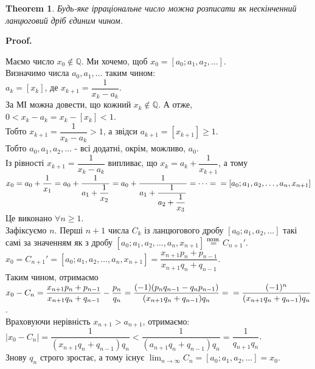 \documentclass[a4paper, 10pt]{article}
\makeatletter
\theoremstyle{theoremdd}
\newtheorem{theorem}{Theorem}[subsection]
\theoremstyle{theoremdd}
\theoremstyle{theoremdd}
\theoremstyle{theoremdd}
\theoremstyle{theoremdd}
\theoremstyle{theoremdd}
\theoremstyle{theoremdd}
\theoremstyle{theoremdd}
\renewenvironment{proof}[1][Proof.\\]{\par
\pushQED{\hfill \qed}%
\normalfont \topsep6\p@\@plus6\p@\relax
\trivlist
\item\relax
{\bfseries
#1\@addpunct{.}}\hspace\labelsep\ignorespaces
}{%
\popQED\endtrivlist\@endpefalse
}
\makeatother
\begin{document}
\begin{theorem}
Будь-яке ірраціональне число можна розписати як нескінченний ланцюговий дріб єдиним чином.
\end{theorem}

\begin{proof}
Маємо число $x_0 \not\in \mathbb{Q}$. Ми хочемо, щоб $x_0 = [a_0;a_1,a_2,\dots]$.\\
Визначимо числа $a_0,a_1,\dots$ таким чином:\\
$a_k = [x_k]$, де $x_{k+1} = \dfrac{1}{x_k - a_k}$.\\
За МІ можна довести, що кожний $x_k \not\in \mathbb{Q}$. А отже, \\ $0 < x_k-a_k = x_k - [x_k] < 1$.\\
Тобто $x_{k+1} = \dfrac{1}{x_k-a_k} > 1$, а звідси $a_{k+1} = [x_{k+1}] \geq 1$.\\
Тобто $a_0, a_1,a_2,\dots$ - всі додатні, окрім, можливо, $a_0$.\\
Із рівності $x_{k+1} = \dfrac{1}{x_k-a_k}$ випливає, що $x_k = a_k + \dfrac{1}{x_{k+1}}$, а тому\\
$x_0 = a_0 + \dfrac{1}{x_1} = a_0 + \dfrac{1}{a_1 + \dfrac{1}{x_2}} = a_0 + \dfrac{1}{a_1 + \dfrac{1}{a_2 + \dfrac{1}{x_3}}} = \dots = \\ = [a_0;a_1,a_2,\dots,a_n,x_{n+1}]$\\
Це виконано $\forall n \geq 1$.\\
Зафіксуємо $n$. Перші $n+1$ числа $C_k$ із ланцюгового дробу $[a_0;a_1,a_2,\dots]$ такі самі за значенням як з дробу $[a_0;a_1,a_2,\dots,a_n,x_{n+1}] \overset{\text{позн.}}{=} C_{n+1}'$.\\
$x_0 = C_{n+1}' = [a_0;a_1,a_2,\dots,a_n,x_{n+1}] = \dfrac{x_{n+1}p_n + p_{n-1}}{x_{n+1}q_n+ q_{n-1}}$.\\
Таким чином, отримаємо\\
$x_0 - C_n = \dfrac{x_{n+1}p_n + p_{n-1}}{x_{n+1}q_n + q_{n-1}} - \dfrac{p_n}{q_n} = \dfrac{(-1)(p_nq_{n-1}-q_n p_{n-1})}{(x_{n+1}q_n+q_{n-1})q_n} = \\ = \dfrac{(-1)^n}{(x_{n+1}q_n+q_{n-1})q_n}$.\\
Враховуючи нерівність $x_{n+1} > a_{n+1}$, отримаємо:\\
$|x_0-C_n| = \dfrac{1}{(x_{n+1}q_n+q_{n-1})q_n} < \dfrac{1}{(a_{n+1}q_n + q_{n-1})q_n} = \dfrac{1}{q_{n+1}q_n}$.\\
Знову $q_n$ строго зростає, а тому існує $\displaystyle\lim_{n \to \infty} C_n = [a_0;a_1,a_2,\dots] = x_0$.
\end{proof}
\end{document}
